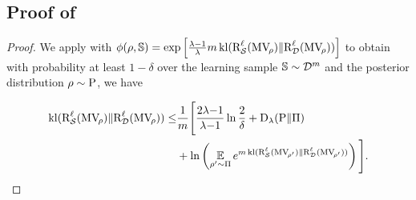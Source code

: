 \begin{noaddcontents}
\section{Proof of }
\label{ap:dis-pra:sec:proof-disintegrated-mv}

\corollarydisintegratedmv*
\begin{proof}
We apply  with $\phi(\rho,\mathbb{S})=\exp\left[\frac{\lambda-1}{\lambda}m\operatorname{kl}(\text{R}^{\ell}_{\mathcal{S}}(\text{MV}_{\!\rho})\|\text{R}^{\ell}_{\mathcal{D}}(\text{MV}_{\!\rho}))\right]$ to obtain with probability at least $1{-}\delta$ over the learning sample $\mathbb{S}\sim\mathcal{D}^m$ and the posterior distribution $\rho\sim\mathrm{P}$, we have 

\begin{align}
    \operatorname{kl}(\text{R}^{\ell}_{\mathcal{S}}(\text{MV}_{\!\rho})\|\text{R}^{\ell}_{\mathcal{D}}(\text{MV}_{\!\rho})) \le &\frac{1}{m}\Bigg[{\frac{2\lambda{-}1}{\lambda{-}1}}\ln\frac{2}{\delta}
 +\operatorname{D}_{\lambda}(\mathrm{P}\|\Pi)\nonumber\\
 &+ \ln\left(\operatorname*{\mathbb{E}}_{\rho'\sim\Pi}e^{m\operatorname{kl}(\text{R}^{\ell}_{\mathcal{S}}(\text{MV}_{\!\rho'})\|\text{R}^{\ell}_{\mathcal{D}}(\text{MV}_{\!\rho'}))}\right) \Bigg].\label{ap:dis-pra:eq:proof-disintegrated-mv-1}
\end{align}


\end{proof}
\end{noaddcontents}
